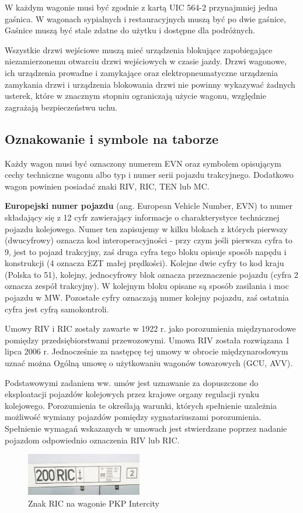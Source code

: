 W każdym wagonie musi być zgodnie z kartą UIC 564-2 przynajmniej jedna gaśnica. W wagonach sypialnych i restauracyjnych muszą być po dwie gaśnice,
Gaśnice muszą być stale zdatne do użytku i dostępne dla podróżnych. 

Wszystkie drzwi wejściowe muszą mieć urządzenia blokujące zapobiegające niezamierzonemu otwarciu drzwi wejściowych w czasie jazdy. Drzwi wagonowe, ich urządzenia prowadne i zamykające oraz elektropneumatyczne urządzenia zamykania drzwi i urządzenia blokowania drzwi nie powinny wykazywać żadnych usterek, które w znacznym stopniu ograniczają użycie wagonu, względnie zagrażają bezpieczeństwu uchu.

\subsection{Oznakowanie i symbole na taborze}

Każdy wagon musi być oznaczony numerem EVN oraz symbolem opisującym cechy techniczne wagonu albo typ i numer serii pojazdu trakcyjnego. Dodatkowo wagon powinien posiadać znaki RIV, RIC, TEN lub MC.

\textbf{Europejski numer pojazdu} (ang. European Vehicle Number, EVN) to numer składający się z 12 cyfr zawierający informacje o charakterystyce technicznej pojazdu kolejowego. 
Numer ten zapisujemy w kilku blokach z których pierwszy (dwucyfrowy) oznacza kod interoperacyjności - przy czym jeśli pierwsza cyfra to 9, jest to pojazd trakcyjny, zaś druga cyfra tego bloku opisuje sposób napędu i konstrukcji (4 oznacza EZT małej prędkości). Kolejne dwie cyfry to kod kraju (Polska to 51), kolejny, jednocyfrowy blok oznacza przeznaczenie pojazdu (cyfra 2 oznacza zespół trakcyjny). W kolejnym bloku opisane są sposób zasilania i moc pojazdu w MW. Pozostałe cyfry oznaczają numer kolejny pojazdu, zaś ostatnia cyfra jest cyfrą samokontroli.

Umowy RIV i RIC zostały zawarte w 1922 r. jako porozumienia międzynarodowe pomiędzy przedsiębiorstwami przewozowymi. Umowa RIV została rozwiązana 1 lipca 2006 r. Jednocześnie za  następcę tej umowy w obrocie międzynarodowym uznać można Ogólną umowę o użytkowaniu wagonów towarowych (GCU, AVV).

Podstawowymi zadaniem ww. umów jest uznawanie za dopuszczone do eksploatacji pojazdów kolejowych przez krajowe organy regulacji rynku kolejowego. Porozumienia te określają warunki, których spełnienie uzależnia możliwość wymiany pojazdów pomiędzy sygnatariuszami porozumienia. Spełnienie wymagań wskazanych w umowach jest stwierdzane poprzez nadanie pojazdom odpowiednio oznaczenia RIV lub RIC.
\begin{figure}
	\includegraphics[width=0.45\textwidth]{skryptkierownik-img/znak-ric.jpg}
	\caption{Znak RIC na wagonie PKP Intercity}
	\label{fig:pantograf2}
\end{figure}


